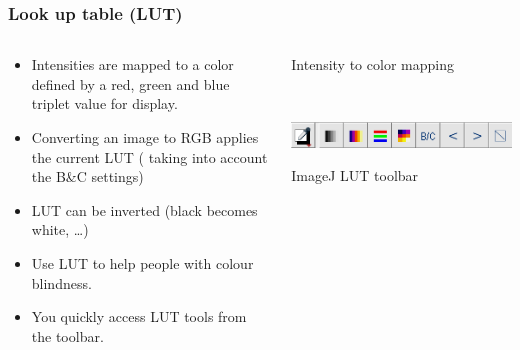 \documentclass[ignorenonframetext,aspectratio=169,10pt,xcolor=table]{beamer}
\begin{document}
\begin{frame} \frametitle{Look up table (LUT)}
  \begin{columns}
    \begin{column}{0.6\textwidth}
      \begin{itemize} \setlength\itemsep{1em}
      \item Intensities are mapped to a color defined by a red, green
        and blue triplet value for display.
      \item Converting an image to RGB applies the current LUT
        ( taking into account the B\&C settings)
      \item LUT can be inverted (black becomes white, \dots)
      \item Use LUT to help people with colour blindness.
      \item You quickly access LUT tools from the toolbar.
      \end{itemize}
    \end{column}
    \begin{column}{0.4\textwidth}
      \begin{center}

        {\tiny Intensity to color mapping}

        ~~

        \includegraphics[width=\textwidth]{lut-tools.png}

        {\tiny ImageJ LUT toolbar}
      \end{center}
    \end{column}
  \end{columns}
\end{frame}
\end{document}
